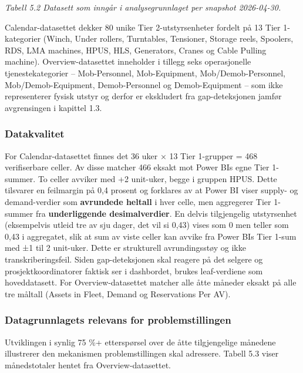 \documentclass[a4paper,11pt]{article}
\begin{document}
\begin{center}\small\textit{Tabell 5.2 Datasett som inngår i analysegrunnlaget per snapshot 2026-04-30.}\end{center}

Calendar-datasettet dekker 80 unike Tier 2-utstyrsenheter fordelt på 13 Tier 1-kategorier (Winch, Under rollers, Turntables, Tensioner, Storage reels, Spoolers, RDS, LMA machines, HPUS, HLS, Generators, Cranes og Cable Pulling machine). Overview-datasettet inneholder i tillegg seks operasjonelle tjenestekategorier – Mob-Personnel, Mob-Equipment, Mob/Demob-Personnel, Mob/Demob-Equipment, Demob-Personnel og Demob-Equipment – som ikke representerer fysisk utstyr og derfor er ekskludert fra gap-deteksjonen jamfør avgrensingen i kapittel 1.3.

\subsubsection{Datakvalitet}

For Calendar-datasettet finnes det 36 uker × 13 Tier 1-grupper = 468 verifiserbare celler. Av disse matcher 466 eksakt mot Power BIs egne Tier 1-summer. To celler avviker med +2 unit-uker, begge i gruppen HPUS. Dette tilsvarer en feilmargin på 0,4 prosent og forklares av at Power BI viser supply- og demand-verdier som \textbf{avrundede heltall} i hver celle, men aggregerer Tier 1-summer fra \textbf{underliggende desimalverdier}. En delvis tilgjengelig utstyrsenhet (eksempelvis utleid tre av sju dager, det vil si 0,43) vises som 0 men teller som 0,43 i aggregatet, slik at sum av viste celler kan avvike fra Power BIs Tier 1-sum med ±1 til 2 unit-uker. Dette er strukturell avrundingsstøy og ikke transkriberingsfeil. Siden gap-deteksjonen skal reagere på det selgere og prosjektkoordinatorer faktisk ser i dashbordet, brukes leaf-verdiene som hoveddatasett. For Overview-datasettet matcher alle åtte måneder eksakt på alle tre måltall (Assets in Fleet, Demand og Reservations Per AV).

\subsubsection{Datagrunnlagets relevans for problemstillingen}

Utviklingen i synlig 75 \%+ etterspørsel over de åtte tilgjengelige månedene illustrerer den mekanismen problemstillingen skal adressere. Tabell 5.3 viser månedstotaler hentet fra Overview-datasettet.
\end{document}
